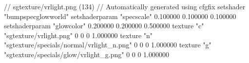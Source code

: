 // sgtexture/vrlight.png (134)
// Automatically generated using cfgfix
setshader "bumpspecglowworld"
setshaderparam "specscale" 0.100000 0.100000 0.100000
setshaderparam "glowcolor" 0.200000 0.200000 0.500000
texture "c" "sgtexture/vrlight.png" 0 0 0 1.000000
texture "n" "sgtexture/specials/normal/vrlight_n.png" 0 0 0 1.000000
texture "g" "sgtexture/specials/glow/vrlight_g.png" 0 0 0 1.000000
